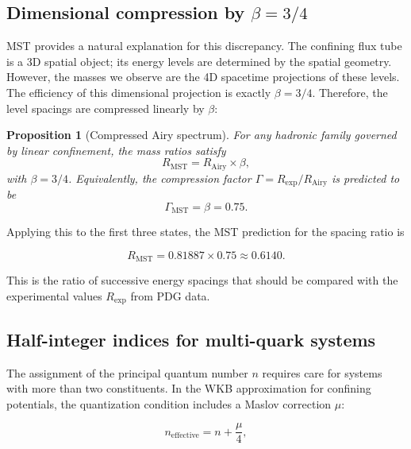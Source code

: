 \documentclass[12pt,a4paper]{article}
\theoremstyle{plain}
\newtheorem{proposition}[theorem]{Proposition}
\theoremstyle{definition}
\theoremstyle{remark}
\begin{document}
\subsection{Dimensional compression by \(\beta = 3/4\)}
MST provides a natural explanation for this discrepancy. The confining flux tube is a 3D spatial object; its energy levels are determined by the spatial geometry. However, the masses we observe are the 4D spacetime projections of these levels. The efficiency of this dimensional projection is exactly \(\beta = 3/4\). Therefore, the level spacings are compressed linearly by \(\beta\):

\begin{proposition}[Compressed Airy spectrum]
\label{prop:compressed}
For any hadronic family governed by linear confinement, the mass ratios satisfy
\begin{equation}
R_{\text{MST}} = R_{\text{Airy}} \times \beta,
\label{eq:compressed}
\end{equation}
with \(\beta = 3/4\). Equivalently, the compression factor \(\Gamma = R_{\text{exp}}/R_{\text{Airy}}\) is predicted to be
\begin{equation}
\Gamma_{\text{MST}} = \beta = 0.75.
\label{eq:GammaMST}
\end{equation}
\end{proposition}

Applying this to the first three states, the MST prediction for the spacing ratio is

\begin{equation}
R_{\text{MST}} = 0.81887 \times 0.75 \approx 0.6140.
\label{eq:RMST}
\end{equation}

This is the ratio of successive energy spacings that should be compared with the experimental values \(R_{\text{exp}}\) from PDG data.

\subsection{Half-integer indices for multi-quark systems}
The assignment of the principal quantum number \(n\) requires care for systems with more than two constituents. In the WKB approximation for confining potentials, the quantization condition includes a Maslov correction \(\mu\):

\begin{equation}
n_{\text{effective}} = n + \frac{\mu}{4},
\label{eq:Maslov}
\end{equation}
\end{document}
